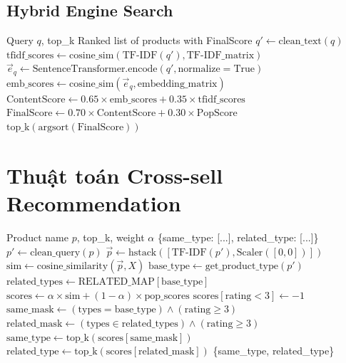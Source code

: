 \documentclass[12pt,a4paper]{report}
\begin{document}
\subsection{Hybrid Engine Search}

\begin{algorithm}[H]
\caption{Hybrid Search (TF-IDF + Sentence Embedding)}
\begin{algorithmic}[1]
\REQUIRE Query $q$, top\_k
\ENSURE Ranked list of products with FinalScore
\STATE $q' \leftarrow \text{clean\_text}(q)$
\STATE {}
\STATE $\text{tfidf\_scores} \leftarrow \text{cosine\_sim}(\text{TF-IDF}(q'), \text{TF-IDF\_matrix})$
\STATE {}
\STATE $\vec{e}_q \leftarrow \text{SentenceTransformer.encode}(q', \text{normalize}=\text{True})$
\STATE $\text{emb\_scores} \leftarrow \text{cosine\_sim}(\vec{e}_q, \text{embedding\_matrix})$
\STATE {}
\STATE $\text{ContentScore} \leftarrow 0.65 \times \text{emb\_scores} + 0.35 \times \text{tfidf\_scores}$
\STATE $\text{FinalScore} \leftarrow 0.70 \times \text{ContentScore} + 0.30 \times \text{PopScore}$
\RETURN $\text{top\_k}(\text{argsort}(\text{FinalScore}))$
\end{algorithmic}
\end{algorithm}

\section{Thuật toán Cross-sell Recommendation}

\begin{algorithm}[H]
\caption{Cross-sell Recommendation (recommend\_click)}
\begin{algorithmic}[1]
\REQUIRE Product name $p$, top\_k, weight $\alpha$
\ENSURE \{same\_type: [...], related\_type: [...]\}
\STATE $p' \leftarrow \text{clean\_query}(p)$
\STATE $\vec{p} \leftarrow \text{hstack}([\text{TF-IDF}(p'), \text{Scaler}([0,0])])$
\STATE $\text{sim} \leftarrow \text{cosine\_similarity}(\vec{p}, X)$
\STATE $\text{base\_type} \leftarrow \text{get\_product\_type}(p')$
\STATE $\text{related\_types} \leftarrow \text{RELATED\_MAP}[\text{base\_type}]$
\STATE $\text{scores} \leftarrow \alpha \times \text{sim} + (1-\alpha) \times \text{pop\_scores}$
\STATE $\text{scores}[\text{rating} < 3] \leftarrow -1$
\STATE {}
\STATE $\text{same\_mask} \leftarrow (\text{types} = \text{base\_type}) \wedge (\text{rating} \geq 3)$
\STATE $\text{related\_mask} \leftarrow (\text{types} \in \text{related\_types}) \wedge (\text{rating} \geq 3)$
\STATE $\text{same\_type} \leftarrow \text{top\_k}(\text{scores}[\text{same\_mask}])$
\STATE $\text{related\_type} \leftarrow \text{top\_k}(\text{scores}[\text{related\_mask}])$
\RETURN \{same\_type, related\_type\}
\end{algorithmic}
\end{algorithm}
\end{document}
